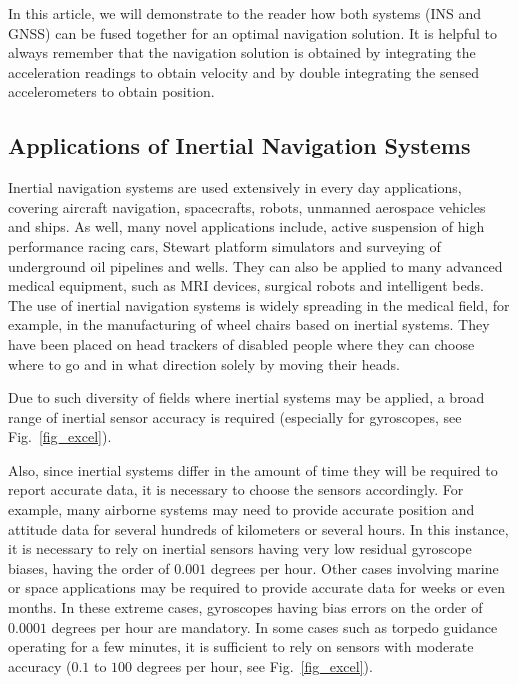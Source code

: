\documentclass[journal]{IEEEtran}
\begin{document}
In this article, we will demonstrate to the reader how both systems (INS and GNSS) can be fused together for an optimal navigation solution. It is helpful to always remember that the navigation solution is obtained by integrating the acceleration readings to obtain  velocity and by double integrating the sensed accelerometers to obtain position.


%
\subsection{Applications of Inertial Navigation Systems}
Inertial navigation systems are used extensively in every day applications, covering aircraft navigation, spacecrafts, robots, unmanned aerospace vehicles and ships. As well, many  novel applications include, active suspension of high performance racing cars, Stewart platform simulators and surveying of underground oil pipelines and wells.
They can also be applied to many advanced medical equipment, such as MRI devices, surgical robots and intelligent beds. The use of inertial navigation systems is widely spreading in the medical field, for example, in the manufacturing of wheel chairs based on inertial systems. They have been placed on head trackers of disabled people where they can choose where to go and in what direction solely by moving their heads.

Due to such diversity of  fields where inertial systems may be applied, a broad range of inertial sensor accuracy is required (especially for gyroscopes, see Fig.~\ref{fig_excel}).

Also, since inertial systems differ in the amount of time they will be required to report accurate data, it is necessary to choose the sensors accordingly. For example, many airborne systems may need to provide accurate position and attitude data for several hundreds of kilometers or several hours. In this instance, it is necessary to rely on inertial sensors having very low residual gyroscope biases, having the order of $0.001$ degrees per hour. Other cases involving marine or space applications may be required to provide accurate data for weeks or even months. In these extreme cases, gyroscopes having bias errors on the order of $0.0001$ degrees per hour are mandatory. In some cases such as torpedo guidance operating for a few minutes, it is sufficient to rely on sensors with moderate accuracy ($0.1$ to $100$ degrees per hour, see Fig.~\ref{fig_excel}). 
\end{document}
